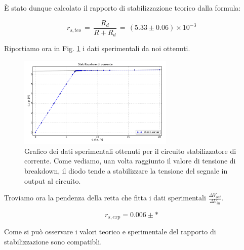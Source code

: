 È stato dunque calcolato il rapporto di stabilizzazione teorico dalla formula: 

\begin{equation}
r_{s,teo}\,=\,\frac{R_d}{R+R_d}\,=\, (5.33 \pm 0.06) \times 10^{-3}
\label{RS_teo}
\end{equation}

Riportiamo ora in Fig. \ref{fig:stabilizer} i dati sperimentali da noi ottenuti.

\begin{figure}[h]
\center
	\includegraphics[width=0.66\textwidth]{stabilizer.pdf}
	\caption{Grafico dei dati sperimentali ottenuti per il circuito stabilizzatore di corrente. Come vediamo, uan volta raggiunto il valore di tensione di breakdown, il diodo tende a stabilizzare la tensione del segnale in output al circuito.}
	\label{fig:stabilizer}
\end{figure}

Troviamo ora la pendenza della retta che fitta i dati sperimentali $\frac{\Delta V_{out}}{\Delta V_{in}}$.

$$r_{s,exp}= 0.006 \pm *$$

Come si può osservare i valori teorico e sperimentale del rapporto di stabilizzazione sono compatibli.%